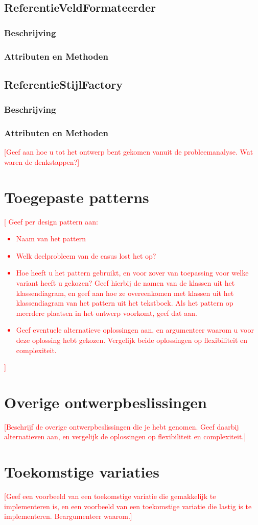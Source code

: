 \documentclass[a4paper]{article}
\newcommand{\todo}[1]{\textcolor{red}{[#1]}}
\begin{document}
\subsection{ReferentieVeldFormateerder}
\subsubsection{Beschrijving}
\subsubsection{Attributen en Methoden}

\subsection{ReferentieStijlFactory}
\subsubsection{Beschrijving}
\subsubsection{Attributen en Methoden}

\todo{Geef aan hoe u tot het ontwerp bent gekomen vanuit de probleemanalyse. Wat waren de denkstappen?}

\section{Toegepaste patterns}
\todo{ Geef per design pattern aan:
\begin{itemize}
	\item Naam van het pattern
	\item	Welk deelprobleem van de casus lost het op?
	\item	Hoe heeft u het pattern gebruikt, en voor zover van toepassing voor welke variant heeft u gekozen? Geef hierbij de namen van de klassen uit het klassendiagram, en geef aan hoe ze overeenkomen met klassen uit het klassendiagram van het pattern uit het tekstboek. Als het pattern op meerdere plaatsen in het ontwerp voorkomt, geef dat aan.
	\item	Geef eventuele alternatieve oplossingen aan, en argumenteer waarom u voor deze oplossing hebt gekozen. Vergelijk beide oplossingen op flexibiliteit en complexiteit.
	\end{itemize}
}

\section{Overige ontwerpbeslissingen}
\todo{Beschrijf de overige ontwerpbeslissingen die je hebt genomen. Geef daarbij alternatieven aan, en vergelijk de oplossingen op flexibiliteit en complexiteit.}

\section{Toekomstige variaties}
\todo{Geef een voorbeeld van een toekomstige variatie die gemakkelijk te implementeren is, en een voorbeeld van een toekomstige variatie die lastig is te implementeren. Beargumenteer waarom.}
\end{document}

